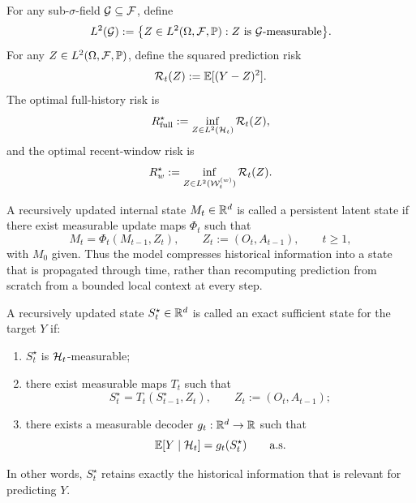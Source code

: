 \begin{definition}
\label{def:predictors_and_risks}
For any sub-$\sigma$-field $\mathcal G \subseteq \mathcal{F}$, define
\[
L^2(\mathcal G)
:=
\bigl\{
Z \in L^2(\Omega,\mathcal{F},\mathbb{P}) : Z \text{ is } \mathcal G\text{-measurable}
\bigr\}.
\]
For any $Z \in L^2(\Omega,\mathcal{F},\mathbb{P})$, define the squared prediction risk
\begin{equation}
\mathcal R_t(Z) := \mathbb{E}[(Y-Z)^2].
\label{eq:general_risk_def}
\end{equation}
The optimal full-history risk is
\begin{equation}
R_{\mathrm{full}}^\star
:=
\inf_{Z \in L^2(\mathcal{H}_t)} \mathcal R_t(Z),
\label{eq:Rfull_def}
\end{equation}
and the optimal recent-window risk is
\begin{equation}
R_{w}^\star
:=
\inf_{Z \in L^2(\mathcal{W}_t^{(w)})} \mathcal R_t(Z).
\label{eq:Rw_def}
\end{equation}
\end{definition}

\begin{definition}
\label{def:persistent_latent_state}
A recursively updated internal state $M_t \in \mathbb{R}^d$ is called a persistent latent state if there exist measurable update maps $\Phi_t$ such that
\begin{equation}
M_t = \Phi_t(M_{t-1}, Z_t),
\qquad
Z_t := (O_t,A_{t-1}),
\qquad t\ge 1,
\label{eq:persistent_state_update}
\end{equation}
with $M_0$ given.
Thus the model compresses historical information into a state that is propagated through time, rather than recomputing prediction from scratch from a bounded local context at every step.
\end{definition}

\begin{definition}
\label{def:exact_sufficient_state}
A recursively updated state $S_t^\star \in \mathbb{R}^d$ is called an exact sufficient state for the target $Y$ if:
\begin{enumerate}
    \item $S_t^\star$ is $\mathcal{H}_t$-measurable;
    \item there exist measurable maps $T_t$ such that
    \begin{equation}
    S_t^\star = T_t(S_{t-1}^\star, Z_t),
    \qquad
    Z_t := (O_t,A_{t-1});
    \label{eq:exact_state_update}
    \end{equation}
    \item there exists a measurable decoder $g_t:\mathbb{R}^d\to\mathbb{R}$ such that
    \begin{equation}
    \mathbb{E}[Y\mid \mathcal{H}_t] = g_t(S_t^\star)
    \qquad \text{a.s.}
    \label{eq:exact_sufficient_state}
    \end{equation}
\end{enumerate}
In other words, $S_t^\star$ retains exactly the historical information that is relevant for predicting $Y$.
\end{definition}

